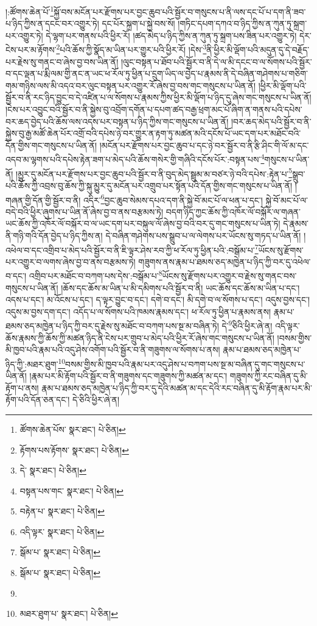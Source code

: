 །:ཚོགས་ཆེན་པོ་\footnote{ཚོགས་ཆེན་པོས་  སྣར་ཐང་།  པེ་ཅིན། }སྐྱོ་བས་མངོན་པར་རྫོགས་པར་བྱང་ཆུབ་པའི་སྦྱོར་བ་གསུངས་པ་ནི་ལས་དང་པོ་པ་དག་ནི་ཟབ་པ་ཉིད་ཀྱིས་ན་དངང་བར་འགྱུར་ཏེ། དང་པོར་སྐྲག་པ་སྐྱེ་བས་སོ། །གཏིང་དཔག་དཀའ་བ་ཉིད་ཀྱིས་ན་ཀུན་ཏུ་སྐྲག་པར་འགྱུར་ཏེ། དེ་ལྷག་པར་གནས་པའི་ཕྱིར་རོ། །ཚད་མེད་པ་ཉིད་ཀྱིས་ན་ཀུན་ཏུ་སྐྲག་པས་ཟིན་པར་འགྱུར་ཏེ། དེར་ངེས་པར་མ་རྟོགས་\footnote{རྟོགས་པས་རྟོགས་  སྣར་ཐང་།  པེ་ཅིན། }པའི་ཆོས་ཀྱི་སྣོད་མ་ཡིན་པར་གྱུར་པའི་ཕྱིར་རོ། །དེས་\footnote{དེ་  སྣར་ཐང་།  པེ་ཅིན། }ནི་ཕྱིར་མི་ལྡོག་པའི་མདུན་དུ་དེ་བརྗོད་པར་རྗེས་སུ་གནང་བ་ཞེས་བྱ་བས་ཡིན་ནོ། །ལུང་བསྟན་པ་ཐོབ་པའི་སྦྱོར་བ་ནི་དེ་ལ་མི་དངང་བ་ལ་སོགས་པའི་སྦྱོར་བ་དང་ལྡན་པ་རྨི་ལམ་གྱི་ནང་ན་ཡང་ཕ་རོལ་ཏུ་ཕྱིན་པ་དྲུག་ཡིད་ལ་བྱེད་པ་རྣམས་ནི་དེ་བཞིན་གཤེགས་པ་གཅིག་གམ་གཉིས་ལས་མི་འདའ་བར་ལུང་བསྟན་པར་འགྱུར་རོ་ཞེས་བྱ་བས་གང་གསུངས་པ་ཡིན་ནོ། །ཕྱིར་མི་ལྡོག་པའི་སྦྱོར་བ་ནི་རང་ཉིད་བྱུང་བ་དེ་འཛིན་པ་ལ་སོགས་པ་རྣམས་ཀྱིས་ཕྱིར་མི་ལྡོག་པ་ཉིད་དུ་ཞེས་གང་གསུངས་པ་ཡིན་ནོ། །ངེས་པར་འབྱུང་བའི་སྦྱོར་བ་ནི་སྐྱེས་བུ་འབྲོག་དགོན་པ་དཔག་ཚད་བརྒྱ་ཕྲག་མང་པོ་ཞིག་ན་གནས་པའི་དཔེས་བར་ཆད་བྱེད་པའི་ཆོས་ལས་འདས་པར་བསྟན་པ་ཉིད་ཀྱིས་གང་གསུངས་པ་ཡིན་ནོ། །བར་ཆད་མེད་པའི་སྦྱོར་བ་ནི་སྐྱེས་བུ་རྒྱ་མཚོ་ཆེན་པོར་འགྲོ་བའི་དཔེས་ཉེ་བར་གྱུར་ན་རྟག་ཏུ་མཚན་མའི་དངོས་པོ་ཡང་དག་པར་མཐོང་བའི་དོན་གྱིས་གང་གསུངས་པ་ཡིན་ནོ། །མངོན་པར་རྫོགས་པར་བྱང་ཆུབ་པ་དང་ཉེ་བར་སྦྱོར་བ་ནི་རྩི་ཤིང་གི་ལོ་མ་དང་འདབ་མ་ལྷགས་པའི་དཔེས་རྟེན་ཟག་པ་མེད་པའི་ཆོས་གསེར་གྱི་གཞིའི་དངོས་པོར་:བསྟན་པས་\footnote{བསྟན་པས་གང་  སྣར་ཐང་།  པེ་ཅིན། }གསུངས་པ་ཡིན་ནོ། །མྱུར་དུ་མངོན་པར་རྫོགས་པར་བྱང་ཆུབ་པའི་སྦྱོར་བ་ནི་བུད་མེད་སྦྲུམ་མ་བཙར་ཉེ་བའི་དཔེས་:རྟེན་པ་\footnote{བརྟེན་པ་  སྣར་ཐང་།  པེ་ཅིན། }སྒྲུབ་པའི་ཆོས་ཀྱི་འབྲས་བུ་ཆོས་ཀྱི་སྐུ་མྱུར་དུ་མངོན་པར་འགྲུབ་པར་སྟོན་པའི་དོན་གྱིས་གང་གསུངས་པ་ཡིན་ནོ། །གཞན་གྱི་དོན་གྱི་སྦྱོར་བ་ནི། འདིར་\footnote{འདི་ལྟར་  སྣར་ཐང་།  པེ་ཅིན། }བྱང་ཆུབ་སེམས་དཔའ་དག་ནི་སྐྱེ་བོ་མང་པོ་ལ་ཕན་པ་དང་། སྐྱེ་བོ་མང་པོ་ལ་བདེ་བའི་ཕྱིར་ཞུགས་པ་ཡིན་ནོ་ཞེས་བྱ་བ་ནས་བརྩམས་ཏེ། བདག་ཉིད་ཀྱང་ཆོས་ཀྱི་འཁོར་ལོ་བསྐོར་ལ་གཞན་ཡང་ཆོས་ཀྱི་འཁོར་ལོ་བསྐོར་བ་ལ་ཡང་དག་པར་བསྐུལ་ལོ་ཞེས་བྱ་བའི་བར་དུ་གང་གསུངས་པ་ཡིན་ཏེ། དེ་རྣམས་ནི་གཉི་གའི་དོན་བྱེད་པ་ཉིད་ཀྱིས་ན། དེ་བཞིན་གཤེགས་པས་སྒྲུབ་པ་ལ་ལེགས་པར་ཡོངས་སུ་གཏད་པ་ཡིན་ནོ། །འཕེལ་བ་དང་འགྲིབ་པ་མེད་པའི་སྦྱོར་བ་ནི་ཇི་ལྟར་ཤེས་རབ་ཀྱི་ཕ་རོལ་ཏུ་ཕྱིན་པའི་:བསྒོམ་པ་\footnote{སྒོམ་པ་  སྣར་ཐང་།  པེ་ཅིན། }ཡོངས་སུ་རྫོགས་པར་འགྱུར་བ་ལགས་ཞེས་བྱ་བ་ནས་བརྩམས་ཏེ། གཟུགས་ནས་རྣམ་པ་ཐམས་ཅད་མཁྱེན་པ་ཉིད་ཀྱི་བར་དུ་འཕེལ་བ་དང་། འགྲིབ་པར་མཐོང་བ་བཀག་པས་དེས་:བསྒོམ་པ་\footnote{སྒོམ་པ་  སྣར་ཐང་།  པེ་ཅིན། }ཡོངས་སུ་རྫོགས་པར་འགྱུར་བ་རྗེས་སུ་གནང་བས་གསུངས་པ་ཡིན་ནོ། །ཆོས་དང་ཆོས་མ་ཡིན་པ་མི་དམིགས་པའི་སྦྱོར་བ་ནི། ཡང་ཆོས་དང་ཆོས་མ་ཡིན་པ་དང་། འདས་པ་དང་། མ་འོངས་པ་དང་། ད་ལྟར་བྱུང་བ་དང་། དགེ་བ་དང་། མི་དགེ་བ་ལ་སོགས་པ་དང་། འདུས་བྱས་དང་། འདུས་མ་བྱས་དག་དང་། འདོད་པ་ལ་སོགས་པའི་ཁམས་རྣམས་དང་། ཕ་རོལ་ཏུ་ཕྱིན་པ་རྣམས་ནས། རྣམ་པ་ཐམས་ཅད་མཁྱེན་པ་ཉིད་ཀྱི་བར་དུ་རྗེས་སུ་མཐོང་བ་བཀག་པས་སྔ་མ་བཞིན་ཏེ། དེ་\footnote{}ཅིའི་ཕྱིར་ཞེ་ན། འདི་ལྟར་ཆོས་རྣམས་ཀྱི་ཆོས་ཀྱི་མཚན་ཉིད་ནི་ངེས་པར་གྲུབ་པ་མེད་པའི་ཕྱིར་རོ་ཞེས་གང་གསུངས་པ་ཡིན་ནོ། །བསམ་གྱིས་མི་ཁྱབ་པའི་རྣམ་པའི་འདུ་ཤེས་འགོག་པའི་སྦྱོར་བ་ནི་གཟུགས་ལ་སོགས་པ་ནས། རྣམ་པ་ཐམས་ཅད་མཁྱེན་པ་ཉིད་ཀྱི་:མཐར་ཐུག་\footnote{མཐར་ཐུག་པ་  སྣར་ཐང་།  པེ་ཅིན། }བསམ་གྱིས་མི་ཁྱབ་པའི་རྣམ་པར་འདུ་ཤེས་པ་བཀག་པས་སྔ་མ་བཞིན་དུ་གང་གསུངས་པ་ཡིན་ནོ། །རྣམ་པར་མི་རྟོག་པའི་སྦྱོར་བ་ནི་གཟུགས་དང་གཟུགས་ཀྱི་མཚན་མ་དང་། གཟུགས་ཀྱི་རང་བཞིན་དུ་མི་རྟོག་པ་ནས། རྣམ་པ་ཐམས་ཅད་མཁྱེན་པ་ཉིད་ཀྱི་བར་དུ་དེའི་མཚན་མ་དང་དེའི་རང་བཞིན་དུ་མི་རྟོག་རྣམ་པར་མི་རྟོག་པའི་དོན་ཅན་དང་། དེ་ཅིའི་ཕྱིར་ཞེ་ན། 